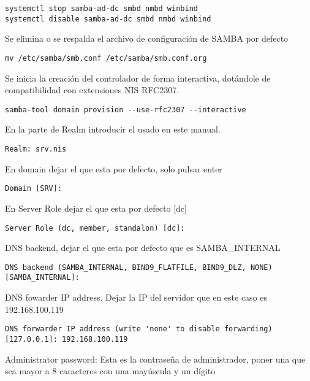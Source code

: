 \documentclass[../main.tex]{subfiles}
\begin{document}
\begin{enumerate}
    \begin{lstlisting}
systemctl stop samba-ad-dc smbd nmbd winbind
systemctl disable samba-ad-dc smbd nmbd winbind
\end{lstlisting}

    Se elimina o se respalda el archivo de configuración de
    SAMBA por defecto
    \begin{lstlisting}
mv /etc/samba/smb.conf /etc/samba/smb.conf.org
    \end{lstlisting}

    Se inicia la creación del controlador de forma interactiva, dotándole de compatibilidad con extensiones NIS RFC2307.

    \begin{lstlisting}
samba-tool domain provision --use-rfc2307 --interactive
\end{lstlisting}

    En la parte de Realm introducir el usado en este manual.

    \begin{lstlisting}
Realm: srv.nis
\end{lstlisting}

    En domain dejar el que esta por defecto, solo pulsar enter

    \begin{lstlisting}
Domain [SRV]:
\end{lstlisting}

    En Server Role dejar el que esta por defecto [dc]

    \begin{lstlisting}
Server Role (dc, member, standalon) [dc]:
    \end{lstlisting}

    DNS backend, dejar el que esta por defecto que es SAMBA\_INTERNAL

    \begin{lstlisting}
DNS backend (SAMBA_INTERNAL, BIND9_FLATFILE, BIND9_DLZ, NONE) [SAMBA_INTERNAL]:
\end{lstlisting}

    DNS fowarder IP address. Dejar la IP del servidor que en este caso es 192.168.100.119

    \begin{lstlisting}
DNS forwarder IP address (write 'none' to disable forwarding) [127.0.0.1]: 192.168.100.119
\end{lstlisting}

    Administrator password: Esta es la contraseña de administrador, poner una que sea mayor a 8 caracteres con una mayúscula y un dígito


\end{enumerate}
\end{document}
